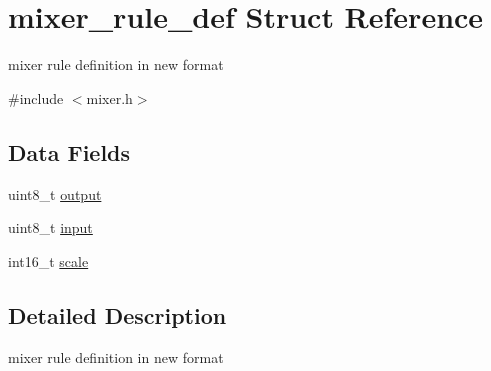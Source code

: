 \hypertarget{structmixer__rule__def}{\section{mixer\+\_\+rule\+\_\+def Struct Reference}
\label{structmixer__rule__def}
}


mixer rule definition in new format  




{\ttfamily \#include $<$mixer.\+h$>$}

\subsection*{Data Fields}
\begin{DoxyCompactItemize}
\item 
uint8\+\_\+t \hyperlink{structmixer__rule__def_a583ebc96f008438e206fccab9f6550c1}{output}
\item 
uint8\+\_\+t \hyperlink{structmixer__rule__def_a113dc2fd59114f28fa4c3c11cf057368}{input}
\item 
int16\+\_\+t \hyperlink{structmixer__rule__def_a5fa76f8ead1f034e7f59e7993cdfe82a}{scale}
\end{DoxyCompactItemize}


\subsection{Detailed Description}
mixer rule definition in new format 

